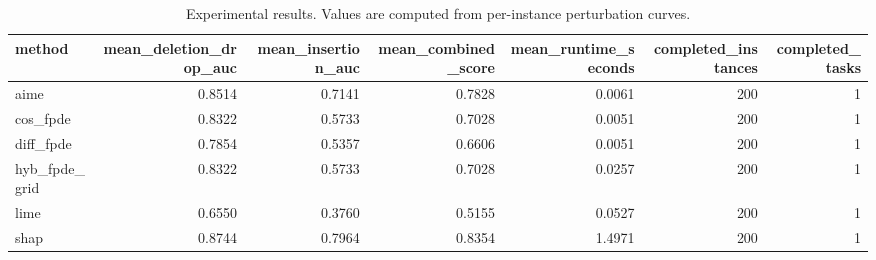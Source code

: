 \begin{table}[t]
\caption{Experimental results. Values are computed from per-instance perturbation curves.}
\label{tab:main_results_computed}
\centering
\begin{tabular}{lrrrrrr}
\toprule
method & mean\_deletion\_drop\_auc & mean\_insertion\_auc & mean\_combined\_score & mean\_runtime\_seconds & completed\_instances & completed\_tasks \\
\midrule
aime & 0.8514 & 0.7141 & 0.7828 & 0.0061 & 200 & 1 \\
cos\_fpde & 0.8322 & 0.5733 & 0.7028 & 0.0051 & 200 & 1 \\
diff\_fpde & 0.7854 & 0.5357 & 0.6606 & 0.0051 & 200 & 1 \\
hyb\_fpde\_grid & 0.8322 & 0.5733 & 0.7028 & 0.0257 & 200 & 1 \\
lime & 0.6550 & 0.3760 & 0.5155 & 0.0527 & 200 & 1 \\
shap & 0.8744 & 0.7964 & 0.8354 & 1.4971 & 200 & 1 \\
\bottomrule
\end{tabular}

\end{table}
